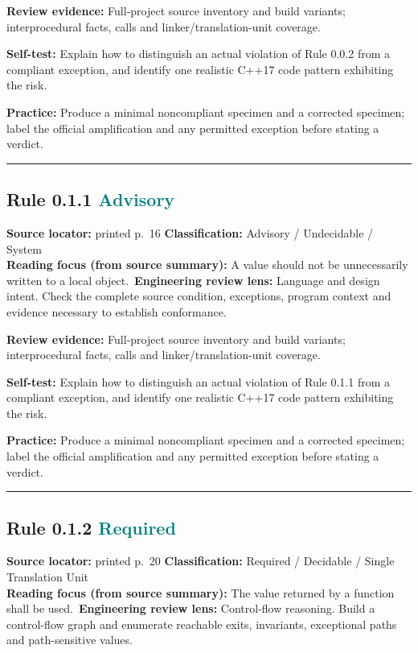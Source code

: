 \documentclass[10pt,letterpaper]{article}
\begin{document}
\textbf{Review evidence:} Full-project source inventory and build variants; interprocedural facts, calls and linker/translation-unit coverage.

\textbf{Self-test:} Explain how to distinguish an actual violation of Rule 0.0.2 from a compliant exception, and identify one realistic C++17 code pattern exhibiting the risk.\par
\textbf{Practice:} Produce a minimal noncompliant specimen and a corrected specimen; label the official amplification and any permitted exception before stating a verdict.
\smallskip\hrule\smallskip
\subsection*{Rule 0.1.1 \enspace \texorpdfstring{\small\textcolor{teal}{Advisory}}{Advisory}}
\noindent\textbf{Source locator:} printed p.~16 \quad\textbf{Classification:} Advisory / Undecidable / System\\
\textbf{Reading focus (from source summary):} A value should not be unnecessarily written to a local object.\
\textbf{Engineering review lens:} Language and design intent. Check the complete source condition, exceptions, program context and evidence necessary to establish conformance.

\textbf{Review evidence:} Full-project source inventory and build variants; interprocedural facts, calls and linker/translation-unit coverage.

\textbf{Self-test:} Explain how to distinguish an actual violation of Rule 0.1.1 from a compliant exception, and identify one realistic C++17 code pattern exhibiting the risk.\par
\textbf{Practice:} Produce a minimal noncompliant specimen and a corrected specimen; label the official amplification and any permitted exception before stating a verdict.
\smallskip\hrule\smallskip
\subsection*{Rule 0.1.2 \enspace \texorpdfstring{\small\textcolor{teal}{Required}}{Required}}
\noindent\textbf{Source locator:} printed p.~20 \quad\textbf{Classification:} Required / Decidable / Single Translation Unit\\
\textbf{Reading focus (from source summary):} The value returned by a function shall be used.\
\textbf{Engineering review lens:} Control-flow reasoning. Build a control-flow graph and enumerate reachable exits, invariants, exceptional paths and path-sensitive values.
\end{document}
